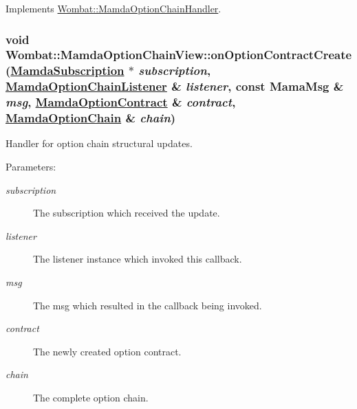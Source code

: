 Implements \hyperlink{classWombat_1_1MamdaOptionChainHandler_be6d7d71f55b09f40273a1ee5120f260}{Wombat::Mamda\-Option\-Chain\-Handler}.\hypertarget{classWombat_1_1MamdaOptionChainView_ebb618efb4207ac512e1a1dda0b5cc73}{
\subsubsection[onOptionContractCreate]{\setlength{\rightskip}{0pt plus 5cm}void Wombat::Mamda\-Option\-Chain\-View::on\-Option\-Contract\-Create (\hyperlink{classWombat_1_1MamdaSubscription}{Mamda\-Subscription} $\ast$ {\em subscription}, \hyperlink{classWombat_1_1MamdaOptionChainListener}{Mamda\-Option\-Chain\-Listener} \& {\em listener}, const Mama\-Msg \& {\em msg}, \hyperlink{classWombat_1_1MamdaOptionContract}{Mamda\-Option\-Contract} \& {\em contract}, \hyperlink{classWombat_1_1MamdaOptionChain}{Mamda\-Option\-Chain} \& {\em chain})}}
\label{classWombat_1_1MamdaOptionChainView_ebb618efb4207ac512e1a1dda0b5cc73}


Handler for option chain structural updates. 

\begin{Desc}
\item[Parameters:]
\begin{description}
\item[{\em subscription}]The subscription which received the update. \item[{\em listener}]The listener instance which invoked this callback. \item[{\em msg}]The msg which resulted in the callback being invoked. \item[{\em contract}]The newly created option contract. \item[{\em chain}]The complete option chain. \end{description}
\end{Desc}


